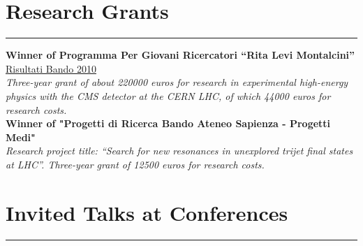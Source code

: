 \documentclass[10pt, a4paper]{article}
\newcommand{\years}[1]{\marginnote{\hskip-0.2in{\scriptsize #1}}}
\begin{document}

\section*{Research Grants}
\vspace{-5pt}
\hrule
\vspace{10pt}
\years{08/2013}\textbf{Winner of Programma Per Giovani
  Ricercatori ``Rita Levi Montalcini''} \\ 
 \href{http://cervelli.cineca.it/ProgGiovRic/dm050813_683.pdf}{Risultati Bando 2010} \\
\emph{Three-year grant of about 220000 euros for research in experimental high-energy
  physics with the CMS detector at the CERN LHC, of which 44000 euros for research costs.}\\

\years{02/2019}\textbf{Winner of "Progetti di Ricerca Bando Ateneo
  Sapienza - Progetti Medi" } \\ 
\emph{Research project title: ``Search for new resonances in
  unexplored trijet final states at LHC''. Three-year grant of 12500 euros for research costs.}


\section*{Invited Talks at Conferences}
\vspace{-5pt}
\hrule
\vspace{10pt}
\noindent
\end{document}
